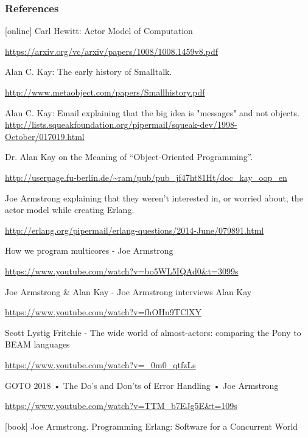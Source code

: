 \documentclass{beamer}
\begin{document}
\begin{frame}[t, allowframebreaks]
\frametitle{References}
\begin{thebibliography}{9}

[online]
Carl Hewitt: Actor Model of Computation

\url{https://arxiv.org/vc/arxiv/papers/1008/1008.1459v8.pdf}

Alan C. Kay: The early history of Smalltalk.

\url{http://www.metaobject.com/papers/Smallhistory.pdf}


Alan C. Kay: Email explaining that the big idea is "messages" and not objects.
\url{http://lists.squeakfoundation.org/pipermail/squeak-dev/1998-October/017019.html}

Dr. Alan Kay on the Meaning of “Object-Oriented Programming”.

\url{http://userpage.fu-berlin.de/~ram/pub/pub_jf47ht81Ht/doc_kay_oop_en}

Joe Armstrong explaining that they weren't interested in, or worried about, the actor model while creating Erlang.

\url{http://erlang.org/pipermail/erlang-questions/2014-June/079891.html}

How we program multicores - Joe Armstrong

\url{https://www.youtube.com/watch?v=bo5WL5IQAd0&t=3099s}

Joe Armstrong & Alan Kay - Joe Armstrong interviews Alan Kay

\url{https://www.youtube.com/watch?v=fhOHn9TClXY}

Scott Lystig Fritchie - The wide world of almost-actors: comparing the Pony to BEAM languages

\url{https://www.youtube.com/watch?v=_0m0_qtfzLs}

GOTO 2018 • The Do's and Don'ts of Error Handling • Joe Armstrong

\url{https://www.youtube.com/watch?v=TTM_b7EJg5E&t=109s}






[book]
Joe Armstrong. Programming Erlang: Software for a Concurrent World

\end{thebibliography}
\end{frame}
\end{document}
